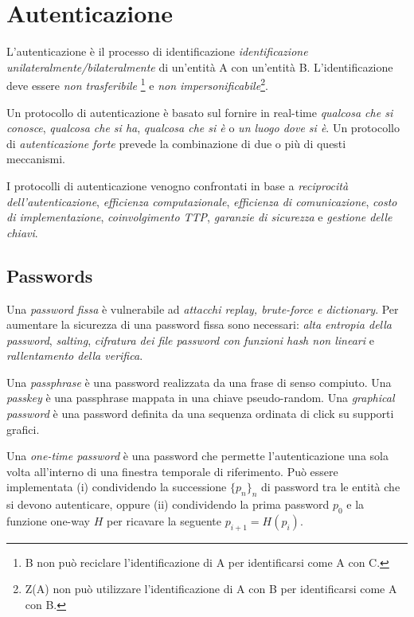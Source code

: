 \chapter{Autenticazione}
\label{chp:authentication}

L'autenticazione è il processo di identificazione \textit{identificazione unilateralmente/bilateralmente} di un'entità A con un'entità B. L'identificazione deve essere \textit{non trasferibile} \footnote{B non può reciclare l'identificazione di A per identificarsi come A con C.} e \textit{non impersonificabile}\footnote{Z(A) non può utilizzare l'identificazione di A con B per identificarsi come A con B.}.

Un protocollo di autenticazione è basato sul fornire in real-time \textit{qualcosa che si conosce}, \textit{qualcosa che si ha}, \textit{qualcosa che si è} o \textit{un luogo dove si è}.
Un protocollo di \textit{autenticazione forte} prevede la combinazione di due o più di questi meccanismi.

I protocolli di autenticazione venogno confrontati in base a \textit{reciprocità dell'autenticazione}, \textit{efficienza computazionale}, \textit{efficienza di comunicazione}, \textit{costo di implementazione}, \textit{coinvolgimento TTP}, \textit{garanzie di sicurezza} e \textit{gestione delle chiavi}.


\section{Passwords}
Una \textit{password fissa} è vulnerabile ad \textit{attacchi replay, brute-force e dictionary}.
Per aumentare la sicurezza di una password fissa sono necessari: \textit{alta entropia della password}, \textit{salting}, \textit{cifratura dei file password con funzioni hash non lineari} e \textit{rallentamento della verifica}.

Una \textit{passphrase} è una password realizzata da una frase di senso compiuto. Una \textit{passkey} è una passphrase mappata in una chiave pseudo-random.
Una \textit{graphical password} è una password definita da una sequenza ordinata di click su supporti grafici.

Una \textit{one-time password} è una password che permette l'autenticazione una sola volta all'interno di una finestra temporale di riferimento. Può essere implementata (i) condividendo la successione $\{p_{n}\}_{n}$ di password tra le entità che si devono autenticare, oppure (ii) condividendo la prima password $p_{0}$ e la funzione one-way $H$ per ricavare la seguente $p_{i+1}=H(p_{i})$.

